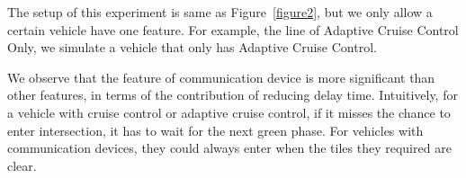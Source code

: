 The setup of this experiment is same as Figure~\ref{figure2}, but we
only allow a certain vehicle have one feature. For example, the line
of Adaptive Cruise Control Only, we simulate a vehicle that only has
Adaptive Cruise Control.

We observe that the feature of communication device is more
significant than other features, in terms of the contribution of
reducing delay time. Intuitively, for a vehicle with cruise control or
adaptive cruise control, if it misses the chance to enter
intersection, it has to wait for the next green phase. For vehicles
with communication devices, they could always enter when the tiles
they required are clear.




